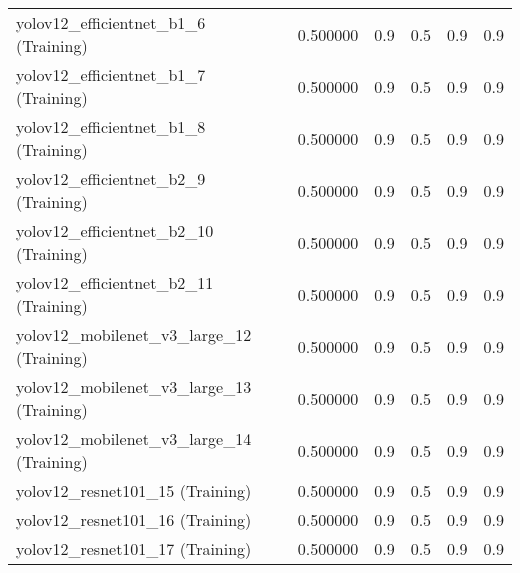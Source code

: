 \begin{table}[h]
\begin{tabular}{lrllll}
yolov12_efficientnet_b1_6 (Training) & 0.500000 & 0.9 & 0.5 & 0.9 & 0.9 \\
yolov12_efficientnet_b1_7 (Training) & 0.500000 & 0.9 & 0.5 & 0.9 & 0.9 \\
yolov12_efficientnet_b1_8 (Training) & 0.500000 & 0.9 & 0.5 & 0.9 & 0.9 \\
yolov12_efficientnet_b2_9 (Training) & 0.500000 & 0.9 & 0.5 & 0.9 & 0.9 \\
yolov12_efficientnet_b2_10 (Training) & 0.500000 & 0.9 & 0.5 & 0.9 & 0.9 \\
yolov12_efficientnet_b2_11 (Training) & 0.500000 & 0.9 & 0.5 & 0.9 & 0.9 \\
yolov12_mobilenet_v3_large_12 (Training) & 0.500000 & 0.9 & 0.5 & 0.9 & 0.9 \\
yolov12_mobilenet_v3_large_13 (Training) & 0.500000 & 0.9 & 0.5 & 0.9 & 0.9 \\
yolov12_mobilenet_v3_large_14 (Training) & 0.500000 & 0.9 & 0.5 & 0.9 & 0.9 \\
yolov12_resnet101_15 (Training) & 0.500000 & 0.9 & 0.5 & 0.9 & 0.9 \\
yolov12_resnet101_16 (Training) & 0.500000 & 0.9 & 0.5 & 0.9 & 0.9 \\
yolov12_resnet101_17 (Training) & 0.500000 & 0.9 & 0.5 & 0.9 & 0.9 \\
\bottomrule
\end{tabular}

\end{table}

